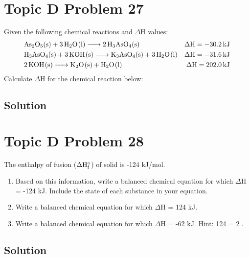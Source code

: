 \documentclass[10pt]{article}
\begin{document}
    \pagebreak
    \section{Topic D Problem 27}
        Given the following chemical reactions and $\Delta$H values:
        \begin{align*}
            &\ce{As2O5(s) + 3 H2O(l) -> 2 H3AsO4(s)}            &\rm \Delta H = -30.2\,\unit{\kilo\joule}\\
            &\ce{H3AsO4(s) + 3 KOH(s) -> K3AsO4(s) + 3 H2O(l)}  &\rm \Delta H = -31.6\,\unit{\kilo\joule}\\
            &\ce{2 KOH(s) -> K2O(s) + H2O(l)}                   &\rm \Delta H = 202.0\,\unit{\kilo\joule}
        \end{align*}
        Calculate $\Delta$H for the chemical reaction below:
        \begin{center}
        \end{center}

        \subsection{Solution}



    \pagebreak
    \section{Topic D Problem 28}
        The enthalpy of fusion ($\rm \Delta H_f^{\circ}$) of solid  is -124 kJ/mol.
        \begin{enumerate}[label=\alph*)]
            \item   Based on this information, write a balanced chemical equation for which $\Delta$H = -124 kJ. Include the state of each substance in your equation.
            \item   Write a balanced chemical equation for which $\Delta$H = 124 kJ.
            \item   Write a balanced chemical equation for which $\Delta$H = -62 kJ. Hint: 124 = 2 .
        \end{enumerate}

        \subsection{Solution}
\end{document}
